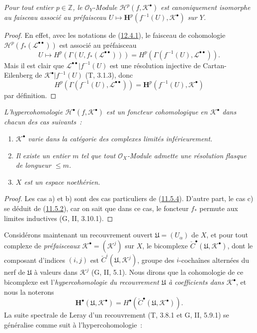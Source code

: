 \begin{proposition}[12.4.3]
\label{0.12.4.3-fr}
\emph{Pour tout entier $p\in\mathbb Z$, le $\mathcal O_Y$-Module
$\mathcal H^p(f,\mathcal K^\bullet)$ est canoniquement isomorphe au
faisceau associé au préfaisceau
$U\mapsto\mathbf H^p(f^{-1}(U),\mathcal K^\bullet)$ sur $Y$.}
\end{proposition}

\begin{proof}
En effet, avec les notations de
(\hyperref[0.12.4.1-fr]{12.4.1}), le faisceau de cohomologie
$\mathcal H^p(f_*(\mathcal L^{\bullet\bullet}))$ est associé au préfaisceau
\[
U\longmapsto H^p(\Gamma(U,f_*(\mathcal L^{\bullet\bullet})))
=H^p(\Gamma(f^{-1}(U),\mathcal L^{\bullet\bullet})).
\]
Mais il est clair que
$\mathcal L^{\bullet\bullet}|f^{-1}(U)$ est une résolution injective de
Cartan-Eilenberg de $\mathcal K^\bullet|f^{-1}(U)$ (T, 3.1.3), donc
\[
H^p(\Gamma(f^{-1}(U),\mathcal L^{\bullet\bullet}))
=\mathbf H^p(f^{-1}(U),\mathcal K^\bullet)
\]
par définition.
\end{proof}

\begin{proposition}[12.4.4]
\label{0.12.4.4-fr}
\emph{L'hypercohomologie $\mathcal H^\bullet(f,\mathcal K^\bullet)$ est
un foncteur cohomologique en $\mathcal K^\bullet$ dans chacun des cas
suivants~:}
\begin{enumerate}
\item[\emph{a)}]
\emph{$\mathcal K^\bullet$ varie dans la catégorie des complexes limités
inférieurement.}
\item[\emph{b)}]
\emph{Il existe un entier $m$ tel que tout $\mathcal O_X$-Module admette
une résolution flasque de longueur $\leq m$.}
\item[\emph{c)}]
\emph{$X$ est un espace noethérien.}
\end{enumerate}
\end{proposition}

\begin{proof}
Les cas a) et b) sont des cas particuliers de
(\hyperref[0.11.5.4-fr]{11.5.4}). D'autre part, le cas c) se déduit de
(\hyperref[0.11.5.2-fr]{11.5.2}), car on sait que dans ce cas, le foncteur
$f_*$ permute aux limites inductives (G, II, 3.10.1).
\end{proof}

\begin{env}[12.4.5]
\label{0.12.4.5-fr}
Considérons maintenant un recouvrement ouvert
$\mathfrak U=(U_\alpha)$ de $X$, et pour tout complexe de
\emph{préfaisceaux} $\mathcal K^\bullet=(\mathcal K^j)$ sur $X$, le
bicomplexe $\check C^\bullet(\mathfrak U,\mathcal K^\bullet)$, dont le
composant d'indices $(i,j)$ est
$\check C^i(\mathfrak U,\mathcal K^j)$, groupe des $i$-cochaînes alternées
du nerf de $\mathfrak U$ à valeurs dans $\mathcal K^j$ (G, II, 5.1). Nous
dirons que la cohomologie de ce bicomplexe est
l'\emph{hypercohomologie du recouvrement $\mathfrak U$ à coefficients dans
$\mathcal K^\bullet$}, et nous la noterons
\[
\mathbf H^\bullet(\mathfrak U,\mathcal K^\bullet)
=H^\bullet(\check C^\bullet(\mathfrak U,\mathcal K^\bullet)).
\]
La suite spectrale de Leray d'un recouvrement (T, 3.8.1 et G, II, 5.9.1)
se généralise comme suit à l'hypercohomologie~:
\end{env}

